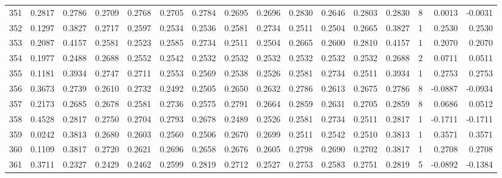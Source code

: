 \begin{tabular}{lrrrrrrrrrrrrrrr}
351 &      0.2817 &  0.2786 &  0.2709 &  0.2768 &  0.2705 &  0.2784 &  0.2695 &  0.2696 &  0.2830 &  0.2646 &   0.2803 &     0.2830 &      8 &                    0.0013 &                    -0.0031 \\
352 &      0.1297 &  0.3827 &  0.2717 &  0.2597 &  0.2534 &  0.2536 &  0.2581 &  0.2734 &  0.2511 &  0.2504 &   0.2665 &     0.3827 &      1 &                    0.2530 &                     0.2530 \\
353 &      0.2087 &  0.4157 &  0.2581 &  0.2523 &  0.2585 &  0.2734 &  0.2511 &  0.2504 &  0.2665 &  0.2600 &   0.2810 &     0.4157 &      1 &                    0.2070 &                     0.2070 \\
354 &      0.1977 &  0.2488 &  0.2688 &  0.2552 &  0.2542 &  0.2532 &  0.2532 &  0.2532 &  0.2532 &  0.2532 &   0.2532 &     0.2688 &      2 &                    0.0711 &                     0.0511 \\
355 &      0.1181 &  0.3934 &  0.2747 &  0.2711 &  0.2553 &  0.2569 &  0.2538 &  0.2526 &  0.2581 &  0.2734 &   0.2511 &     0.3934 &      1 &                    0.2753 &                     0.2753 \\
356 &      0.3673 &  0.2739 &  0.2610 &  0.2732 &  0.2492 &  0.2505 &  0.2650 &  0.2632 &  0.2786 &  0.2613 &   0.2675 &     0.2786 &      8 &                   -0.0887 &                    -0.0934 \\
357 &      0.2173 &  0.2685 &  0.2678 &  0.2581 &  0.2736 &  0.2575 &  0.2791 &  0.2664 &  0.2859 &  0.2631 &   0.2705 &     0.2859 &      8 &                    0.0686 &                     0.0512 \\
358 &      0.4528 &  0.2817 &  0.2750 &  0.2704 &  0.2793 &  0.2678 &  0.2489 &  0.2526 &  0.2581 &  0.2734 &   0.2511 &     0.2817 &      1 &                   -0.1711 &                    -0.1711 \\
359 &      0.0242 &  0.3813 &  0.2680 &  0.2603 &  0.2560 &  0.2506 &  0.2670 &  0.2699 &  0.2511 &  0.2542 &   0.2510 &     0.3813 &      1 &                    0.3571 &                     0.3571 \\
360 &      0.1109 &  0.3817 &  0.2720 &  0.2621 &  0.2696 &  0.2658 &  0.2676 &  0.2605 &  0.2798 &  0.2690 &   0.2702 &     0.3817 &      1 &                    0.2708 &                     0.2708 \\
361 &      0.3711 &  0.2327 &  0.2429 &  0.2462 &  0.2599 &  0.2819 &  0.2712 &  0.2527 &  0.2753 &  0.2583 &   0.2751 &     0.2819 &      5 &                   -0.0892 &                    -0.1384 \\

\end{tabular}
